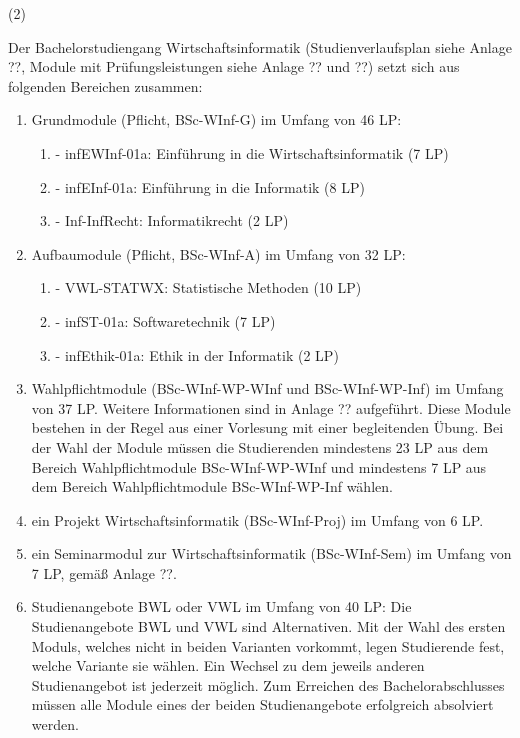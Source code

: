 \documentclass{article}\usepackage{helvet}\renewcommand{\familydefault}{\sfdefault}\usepackage[letterpaper,top=2cm,bottom=2cm,left=3cm,right=3cm,marginparwidth=1.75cm]{geometry}\usepackage[colorlinks=true,allcolors=red]{hyperref}\usepackage{enumitem}\usepackage{tabularx}\usepackage[T1]{fontenc}\setlist[enumerate,1]{label=\arabic*., left=0pt}\setlist[enumerate,2]{label=\alph*., left=0.5em}\setlist[enumerate,3]{label=\alph*\alph*., left=1em}\setlist[enumerate,4]{label=-, left=1.5em}\setlist{nosep}\setlength{\parindent}{0pt}
\begin{document}
	\begin{minipage}[t]
		{2em}
		(2)
	\end{minipage}
\hspace{0.5em}
	\begin{minipage}[t]
		{\dimexpr\linewidth-2em-0.5em\relax}
		Der Bachelorstudiengang Wirtschaftsinformatik (Studienverlaufsplan siehe Anlage {\Large ??}, Module mit Prüfungsleistungen siehe Anlage {\Large ??} und {\Large ??}) setzt sich aus folgenden Bereichen zusammen:
		\begin{enumerate}
			\item{Grundmodule (Pflicht, BSc-WInf-G) im Umfang von 46 LP:
			\begin{enumerate}
				\item{- infEWInf-01a: Einführung in die Wirtschaftsinformatik (7 LP)}
				\item{- infEInf-01a: Einführung in die Informatik (8 LP)}
				\item{- Inf-InfRecht: Informatikrecht (2 LP)}
			\end{enumerate}
}
			\item{Aufbaumodule (Pflicht, BSc-WInf-A) im Umfang von 32 LP:
			\begin{enumerate}
				\item{- VWL-STATWX: Statistische Methoden (10 LP)}
				\item{- infST-01a: Softwaretechnik (7 LP)}
				\item{- infEthik-01a: Ethik in der Informatik (2 LP)}
			\end{enumerate}
}
			\item{Wahlpflichtmodule (BSc-WInf-WP-WInf und BSc-WInf-WP-Inf) im Umfang von 37 LP. Weitere Informationen sind in Anlage {\Large ??} aufgeführt. Diese Module bestehen in der Regel aus einer Vorlesung mit einer begleitenden Übung. Bei der Wahl der Module müssen die Studierenden mindestens 23 LP aus dem Bereich Wahlpflichtmodule BSc-WInf-WP-WInf und mindestens 7 LP aus dem Bereich Wahlpflichtmodule BSc-WInf-WP-Inf wählen.}
			\item{ein Projekt Wirtschaftsinformatik (BSc-WInf-Proj) im Umfang von 6 LP.}
			\item{ein Seminarmodul zur Wirtschaftsinformatik (BSc-WInf-Sem) im Umfang von 7 LP, gemäß Anlage {\Large ??}.}
			\item{Studienangebote BWL oder VWL im Umfang von 40 LP: Die Studienangebote BWL und VWL sind Alternativen. Mit der Wahl des ersten Moduls, welches nicht in beiden Varianten vorkommt, legen Studierende fest, welche Variante sie wählen. Ein Wechsel zu dem jeweils anderen Studienangebot ist jederzeit möglich. Zum Erreichen des Bachelorabschlusses müssen alle Module eines der beiden Studienangebote erfolgreich absolviert werden.
}
\end{enumerate}
\end{minipage}
\end{document}
